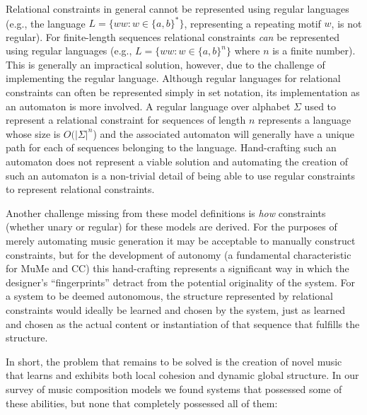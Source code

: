 \documentclass[phd,electronic,oneside,twosidetoc,letterpaper,chaptercenter,parttop,lol,lof,lot]{byumsphd}
\begin{document}
Relational constraints in general cannot be represented using regular languages (e.g., the language $L=\{ww:w\in\{a,b\}^*\}$, representing a repeating motif $w$, is not regular). For finite-length sequences relational constraints \emph{can} be represented using regular languages (e.g., $L=\{ww:w\in\{a,b\}^n\}$ where $n$ is a finite number). This is generally an impractical solution, however, due to the challenge of implementing the regular language. Although regular languages for relational constraints can often be represented simply in set notation, its implementation as an automaton is more involved. A regular language over alphabet $\Sigma$ used to represent a relational constraint for sequences of length $n$ represents a language whose size is $O(|\Sigma |^n$) and the associated automaton will generally have a unique path for each of sequences belonging to the language. Hand-crafting such an automaton does not represent a viable solution and automating the creation of such an automaton is a non-trivial detail of being able to use regular constraints to represent relational constraints.

Another challenge missing from these model definitions is \emph{how} constraints (whether unary or regular) for these models are derived. For the purposes of merely automating music generation it may be acceptable to manually construct constraints, but for the development of autonomy (a fundamental characteristic for MuMe and CC) this hand-crafting represents a significant way in which the designer's ``fingerprints'' detract from the potential originality of the system. For a system to be deemed autonomous, the structure represented by relational constraints would ideally be learned and chosen by the system, just as learned and chosen as the actual content or instantiation of that sequence that fulfills the structure.

In short, the problem that remains to be solved is the creation of novel music that learns and exhibits both local cohesion and dynamic global structure. In our survey of music composition models we found systems that possessed some of these abilities, but none that completely possessed all of them:
\end{document}

